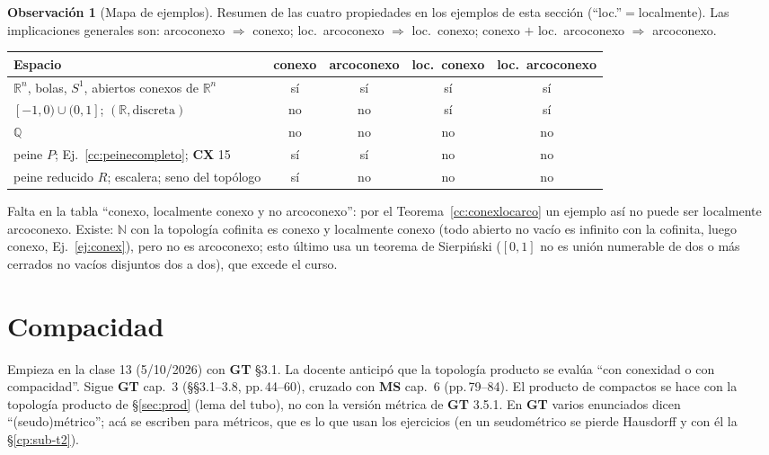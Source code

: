 \documentclass[11pt,a4paper]{article}
\theoremstyle{definition}
\newtheorem{observacion}[definicion]{Observación}
\theoremstyle{plain}
\newcommand{\R}{\mathbb{R}}
\newcommand{\N}{\mathbb{N}}
\newcommand{\Q}{\mathbb{Q}}
\begin{document}
\begin{observacion}[Mapa de ejemplos]
Resumen de las cuatro propiedades en los ejemplos de esta sección (``loc.''$=$localmente). Las implicaciones generales son: arcoconexo $\Rightarrow$ conexo; loc.\ arcoconexo $\Rightarrow$ loc.\ conexo; conexo $+$ loc.\ arcoconexo $\Rightarrow$ arcoconexo.
\begin{center}\small
\begin{tabular}{@{}lcccc@{}}
\hline
Espacio & conexo & arcoconexo & loc.\ conexo & loc.\ arcoconexo\\
\hline
$\R^n$, bolas, $S^1$, abiertos conexos de $\R^n$ & sí & sí & sí & sí\\
$[-1,0)\cup(0,1]$; $(\R,\text{discreta})$ & no & no & sí & sí\\
$\Q$ & no & no & no & no\\
peine $P$; Ej.~\ref{cc:peinecompleto}; \textbf{CX} 15 & sí & sí & no & no\\
peine reducido $R$; escalera; seno del topólogo & sí & no & no & no\\
\hline
\end{tabular}
\end{center}
Falta en la tabla ``conexo, localmente conexo y no arcoconexo'': por el Teorema~\ref{cc:conexlocarco} un ejemplo así no puede ser localmente arcoconexo. Existe: $\N$ con la topología cofinita es conexo y localmente conexo (todo abierto no vacío es infinito con la cofinita, luego conexo, Ej.~\ref{ej:conex}), pero no es arcoconexo; esto último usa un teorema de Sierpi\'nski ($[0,1]$ no es unión numerable de dos o más cerrados no vacíos disjuntos dos a dos), que excede el curso.
\end{observacion}


\section[Compacidad]{Compacidad}\label{sec:compac}

\noindent Empieza en la clase 13 (5/10/2026) con \textbf{GT} \S3.1. La docente anticipó que la topología producto se evalúa ``con conexidad o con compacidad''. Sigue \textbf{GT} cap.~3 (\S\S3.1--3.8, pp.\,44--60), cruzado con \textbf{MS} cap.~6 (pp.\,79--84). El producto de compactos se hace con la topología producto de \S\ref{sec:prod} (lema del tubo), no con la versión métrica de \textbf{GT} 3.5.1. En \textbf{GT} varios enunciados dicen ``(seudo)métrico''; acá se escriben para métricos, que es lo que usan los ejercicios (en un seudométrico se pierde Hausdorff y con él la \S\ref{cp:sub-t2}).
\end{document}
